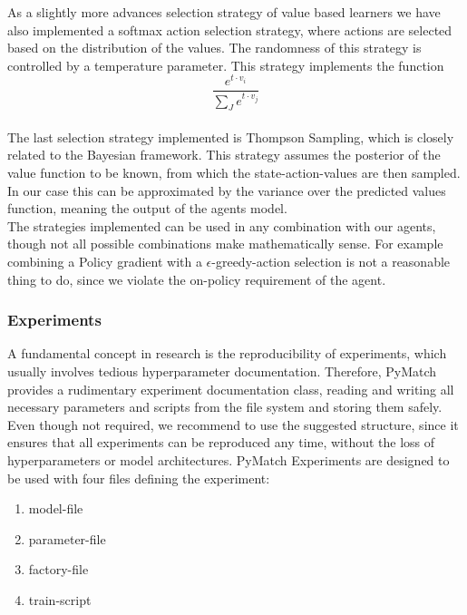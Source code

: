 \documentclass[11pt,a4paper]{article}
\begin{document}
	As a slightly more advances selection strategy of value based learners we have also implemented a softmax action selection strategy, where actions are selected based on the distribution of the values.
	The randomness of this strategy is controlled by a temperature parameter.
	This strategy implements the function
	\[\frac{e^{t \cdot v_i }}{\sum_J e^{t \cdot v_j}}\]\\

	The last selection strategy implemented is Thompson Sampling, which is closely related to the Bayesian framework.
	This strategy assumes the posterior of the value function to be known, from which the state-action-values are then sampled.
	In our case this can be approximated by the variance over the predicted values function, meaning the output of the agents model.\\

	The strategies implemented can be used in any combination with our agents, though not all possible combinations make mathematically sense.
	For example combining a Policy gradient with a $\epsilon$-greedy-action selection is not a reasonable thing to do, since we violate the on-policy requirement of the agent. %

	\subsubsection{Experiments}
	A fundamental concept in research is the reproducibility of experiments, which usually involves tedious hyperparameter documentation.
	Therefore, PyMatch provides a rudimentary experiment documentation class, reading and writing all necessary parameters and scripts from the file system and storing them safely.
	Even though not required, we recommend to use the suggested structure, since it ensures that all experiments can be reproduced any time, without the loss of hyperparameters or model architectures.
	PyMatch Experiments are designed to be used with four files defining the experiment:
	\begin{enumerate}
		\item model-file
		\item parameter-file
		\item factory-file
		\item train-script
	\end{enumerate}
\end{document}
